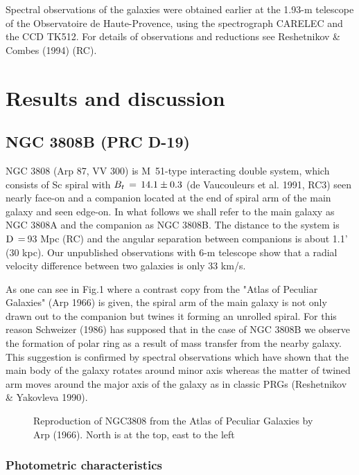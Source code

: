 Spectral observations of the galaxies were obtained earlier at
the 1.93-m telescope of the Observatoire de Haute-Provence, using
the spectrograph CARELEC and the CCD TK512. For details of
observations and reductions see Reshetnikov \& Combes (1994) (RC).

\section{Results and discussion}

\subsection{NGC 3808B (PRC D-19)}

NGC 3808 (Arp 87, VV 300) is M~51-type interacting double system,
which consists of Sc spiral with $B_{t}\rm\,=\,14.1\pm0.3$
(de Vaucouleurs et al. 1991, RC3) seen nearly
face-on and a companion located at the end of spiral arm of the main
galaxy and seen edge-on. In what follows we shall refer
to the main galaxy as NGC 3808A and the companion as NGC 3808B.
The distance to the system is $\rm D\,=\,$93 Mpc (RC) and the angular
separation between companions is about 1.1' (30 kpc). Our unpublished
observations with 6-m telescope show that a radial velocity difference
between two galaxies is only 33 km/s. 

As one can see in Fig.1 where a contrast
copy from the "Atlas of Peculiar Galaxies" (Arp 1966) is given, the
spiral arm of the main galaxy is not only drawn out to the companion
but twines it forming an unrolled spiral. For this reason 
Schweizer (1986) has supposed that in the case of NGC 3808B we observe
the formation of polar ring as a result of mass transfer from the
nearby galaxy. This suggestion is confirmed by spectral observations
which have shown that the main body of the galaxy rotates around minor
axis whereas the matter of twined arm moves around the major axis
of the galaxy as in classic PRGs (Reshetnikov \& Yakovleva 1990).

\begin{figure}
\picplace{1.5cm}
\caption[1]{Reproduction of NGC3808 from the Atlas of Peculiar Galaxies by
Arp (1966). North is at the top, east to the left}
\end{figure}

\subsubsection{Photometric characteristics}

